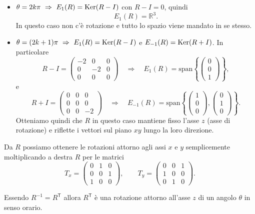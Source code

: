\begin{example}{}
\begin{itemize}
\item $\theta=2k\pi \ \Rightarrow\ E_1(R)=\Ker(R-I)$ con $R-I=0$, quindi
\[
E_1(R)=\mathbb{R}^3.
\]
In questo caso non c'è rotazione e tutto lo spazio viene mandato in se stesso.

\item $\theta=(2k+1)\pi \ \Rightarrow\ E_1(R)=\Ker(R-I)$ e $E_{-1}(R)=\operatorname{Ker}(R+I)$.
In particolare
\[
R-I=
\begin{pmatrix}
-2&0&0\\
0&-2&0\\
0&0&0
\end{pmatrix}
\quad\Rightarrow\quad
E_1(R)=\mathrm{span}\!\left\{\begin{pmatrix}0\\0\\1\end{pmatrix}\right\},
\]
e
\[
R+I=
\begin{pmatrix}
0&0&0\\
0&0&0\\
0&0&-2
\end{pmatrix}
\quad\Rightarrow\quad
E_{-1}(R)=\mathrm{span}\!\left\{\begin{pmatrix}1\\0\\0\end{pmatrix},
\begin{pmatrix}0\\1\\0\end{pmatrix}\right\}.
\]
Otteniamo quindi che $R$ in questo caso mantiene fisso l'asse $z$ (asse di rotazione) e riflette i vettori sul piano $xy$ lungo la loro direzione.
\end{itemize}

\begin{oss}{}
Da $R$ possiamo ottenere le rotazioni attorno agli assi $x$ e $y$ semplicemente moltiplicando a destra $R$ per le matrici
\[
T_x=
\begin{pmatrix}
0&1&0\\
0&0&1\\
1&0&0
\end{pmatrix},
\qquad
T_y=
\begin{pmatrix}
0&0&1\\
1&0&0\\
0&1&0
\end{pmatrix}.
\]
\end{oss}
\fineapprof
\begin{oss}{}
Essendo $R^{-1}=R^{\mathsf T}$ allora $R^{\mathsf T}$ è una rotazione attorno all'asse $z$ di un angolo $\theta$ in senso orario.
\end{oss}
\end{example}

